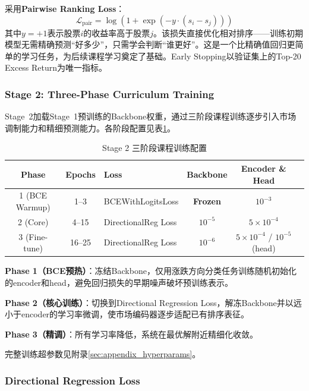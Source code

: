 采用\textbf{Pairwise Ranking Loss}：
\begin{equation}
\mathcal{L}_{\text{pair}} = \log(1 + \exp(-y \cdot (s_i - s_j)))
\end{equation}
其中$y = +1$表示股票$i$的收益率高于股票$j$。该损失直接优化相对排序——训练初期模型无需精确预测“好多少”，只需学会判断“谁更好”。这是一个比精确值回归更简单的学习任务，为后续课程学习奠定了基础。Early Stopping以验证集上的Top-20 Excess Return为唯一指标。

\subsubsection{Stage 2: Three-Phase Curriculum Training}

Stage~2加载Stage~1预训练的Backbone权重，通过三阶段课程训练逐步引入市场调制能力和精细预测能力。各阶段配置见表\ref{tab:stage2_phases}。

\begin{table}[H]
\centering
\caption{Stage 2 三阶段课程训练配置}
\label{tab:stage2_phases}
\begin{tabular}{@{}cclccc@{}}
\toprule
Phase & Epochs & Loss & Backbone & Encoder \& Head \\
\midrule
1 (BCE Warmup)  & 1--3  & BCEWithLogitsLoss  & \textbf{Frozen} & $10^{-3}$ \\
2 (Core)        & 4--15 & DirectionalReg Loss & $10^{-5}$       & $5\times10^{-4}$ \\
3 (Fine-tune)   & 16--25& DirectionalReg Loss & $10^{-6}$       & $5\times10^{-4}$ / $10^{-5}$ (head) \\
\bottomrule
\end{tabular}
\end{table}

\textbf{Phase 1（BCE预热）}：冻结Backbone，仅用涨跌方向分类任务训练随机初始化的encoder和head，避免回归损失的早期噪声破坏预训练表示。

\textbf{Phase 2（核心训练）}：切换到Directional Regression Loss，解冻Backbone并以远小于encoder的学习率微调，使市场编码器逐步适配已有排序表征。

\textbf{Phase 3（精调）}：所有学习率降低，系统在最优解附近精细化收敛。

完整训练超参数见附录\ref{sec:appendix_hyperparams}。

\subsubsection{Directional Regression Loss}

